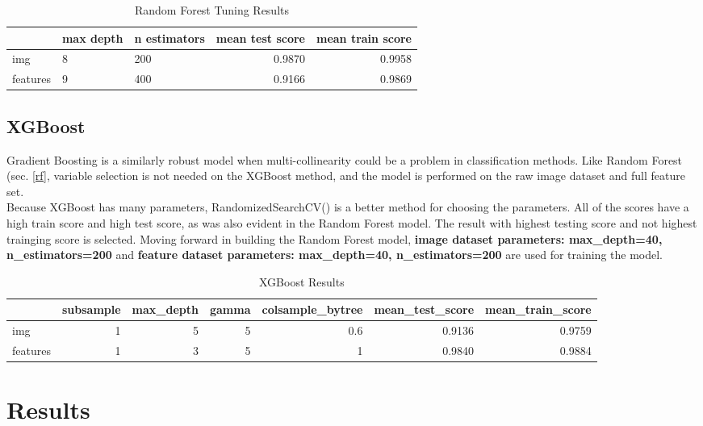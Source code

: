 \documentclass{article}
\begin{document}
\begin{table}[H]
    \centering
        \begin{tabular}{lllrr}
        \toprule
        & max depth & n estimators & mean test score & mean train score \\
        \midrule
        img & 8 & 200 & 0.9870 & 0.9958 \\
        features & 9 & 400 & 0.9166 & 0.9869 \\
        \bottomrule
        \end{tabular}
    \caption{Random Forest Tuning Results}
    \label{rf-results}
\end{table}

\subsection{XGBoost}

Gradient Boosting is a similarly robust model when multi-collinearity could be a problem in classification methods. Like Random Forest (sec. \ref{rf}, variable selection is not needed on the XGBoost method, and the model is performed on the raw image dataset and full feature set.\\

Because XGBoost has many parameters, RandomizedSearchCV() is a better method for choosing the parameters. All of the scores have a high train score and high test score, as was also evident in the Random Forest model. The result with highest testing score and not highest trainging score is selected. Moving forward in building the Random Forest model, \textbf{image dataset parameters: max\_depth=40, n\_estimators=200} and \textbf{feature dataset parameters: max\_depth=40, n\_estimators=200} are used for training the model.

\begin{table}[H]
    \centering
        \begin{tabular}{lrrrrrr}
        \toprule
        &subsample & max\_depth & gamma & colsample\_bytree & mean\_test\_score & mean\_train\_score \\
        \midrule
        img & 1 & 5 & 5 & 0.6 & 0.9136 & 0.9759 \\
        features &  1 & 3 & 5 & 1 & 0.9840 & 0.9884 \\
        \bottomrule
        \end{tabular}
    \caption{XGBoost Results}
    \label{tab:my_label}
\end{table}

\section{Results} \label{sec-results}
\end{document}
